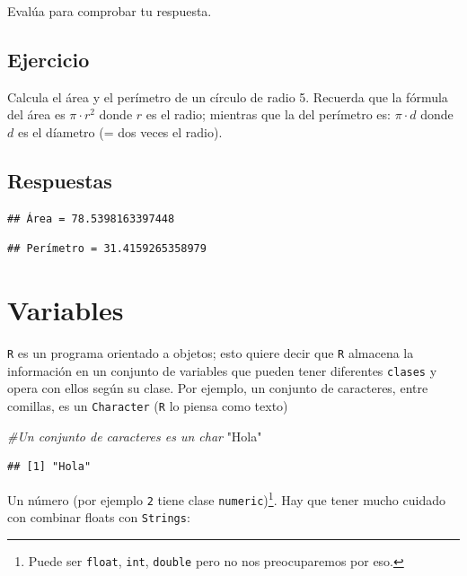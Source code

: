 \documentclass[
]{book}
\newenvironment{Shaded}{\begin{snugshade}}{\end{snugshade}}
\newcommand{\CommentTok}[1]{\textcolor[rgb]{0.56,0.35,0.01}{\textit{#1}}}
\newcommand{\StringTok}[1]{\textcolor[rgb]{0.31,0.60,0.02}{#1}}
\begin{document}
Evalúa para comprobar tu respuesta.

\hypertarget{ejercicio-12}{%
\subsection{Ejercicio}\label{ejercicio-12}}

Calcula el área y el perímetro de un círculo de radio 5. Recuerda que la fórmula del área es \(\pi \cdot r^2\) donde \(r\) es el radio; mientras que la del perímetro es: \(\pi \cdot d\) donde \(d\) es el díametro (= dos veces el radio).

\hypertarget{respuestas}{%
\subsection{Respuestas}\label{respuestas}}

\begin{verbatim}
## Área = 78.5398163397448
\end{verbatim}

\begin{verbatim}
## Perímetro = 31.4159265358979
\end{verbatim}

\hypertarget{variables}{%
\section{Variables}\label{variables}}

\texttt{R} es un programa orientado a objetos; esto quiere decir que \texttt{R} almacena la información en un conjunto de variables que pueden tener diferentes \texttt{clases} y opera con ellos según su clase. Por ejemplo, un conjunto de caracteres, entre comillas, es un \texttt{Character} (\texttt{R} lo piensa como texto)

\begin{Shaded}
\begin{Highlighting}[]
\CommentTok{\#Un conjunto de caracteres es un char}
\StringTok{"Hola"}
\end{Highlighting}
\end{Shaded}

\begin{verbatim}
## [1] "Hola"
\end{verbatim}

Un número (por ejemplo \texttt{2} tiene clase \texttt{numeric})\footnote{Puede ser \texttt{float}, \texttt{int}, \texttt{double} pero no nos preocuparemos por eso.}. Hay que tener mucho cuidado con combinar floats con \texttt{Strings}:
\end{document}
